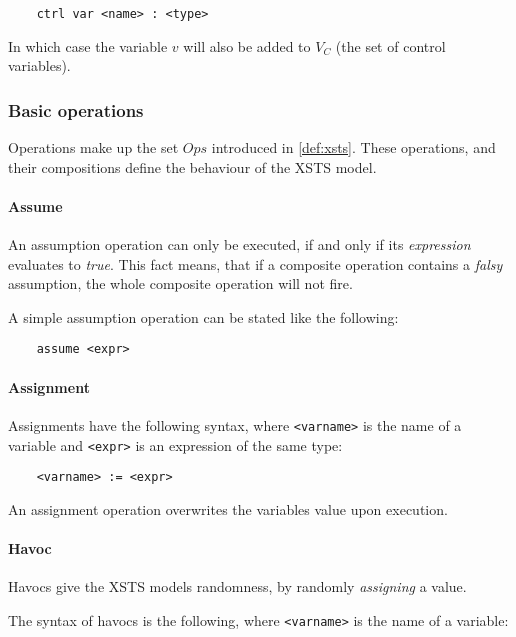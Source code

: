 \begin{lstlisting}
	ctrl var <name> : <type>
\end{lstlisting}

In which case the variable \(v\) will also be added to \(V_C\) (the set of control variables).

\subsubsection{Basic operations}

Operations make up the set \(Ops\) introduced in \autoref{def:xsts}. These operations, and their compositions define the behaviour of the XSTS model.

\paragraph{Assume}

An assumption operation can only be executed, if and only if its \emph{expression} evaluates to \emph{true}. This fact means, that if a composite operation contains a \emph{falsy} assumption, the whole composite operation will not fire.

A simple assumption operation can be stated like the following:

\begin{lstlisting}
	assume <expr>
\end{lstlisting}

\paragraph{Assignment}

Assignments have the following syntax, where \verb|<varname>| is the name of a variable and
\verb|<expr>| is an expression of the same type:

\begin{lstlisting}
	<varname> := <expr>
\end{lstlisting}

An assignment operation overwrites the variables value upon execution.

\paragraph{Havoc}

Havocs give the XSTS models randomness, by randomly \emph{assigning} a value.

The syntax of havocs is the following, where \verb|<varname>| is the name of a variable:

